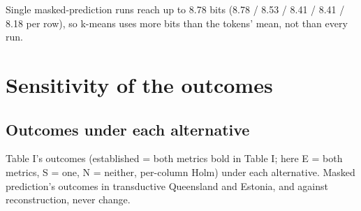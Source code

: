 \documentclass[10pt]{article}
\begin{document}
Single masked-prediction runs reach up to 8.78 bits (8.78 / 8.53 / 8.41 / 8.41 / 8.18 per row), so k-means uses more bits than the tokens' mean, not than every run.

\section{Sensitivity of the outcomes}

\subsection{Outcomes under each alternative}

Table I's outcomes (established = both metrics bold in Table I; here E = both metrics, S = one, N = neither, per-column Holm) under each alternative. Masked prediction's outcomes in transductive Queensland and Estonia, and against reconstruction, never change.
\end{document}
